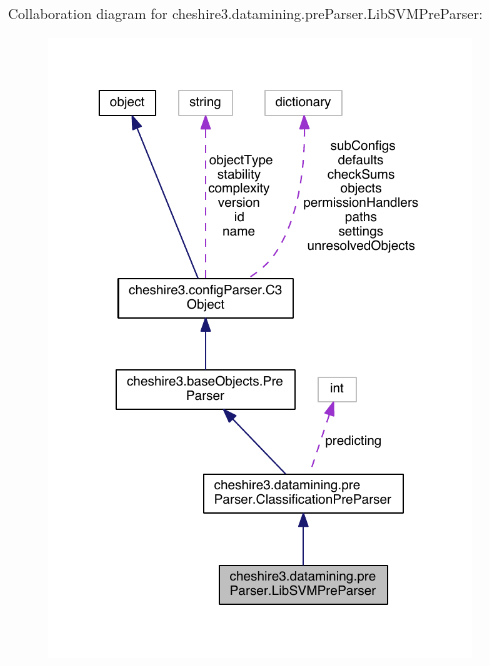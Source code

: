 Collaboration diagram for cheshire3.\-datamining.\-pre\-Parser.\-Lib\-S\-V\-M\-Pre\-Parser\-:
\nopagebreak
\begin{figure}[H]
\begin{center}
\leavevmode
\includegraphics[width=325pt]{classcheshire3_1_1datamining_1_1pre_parser_1_1_lib_s_v_m_pre_parser__coll__graph}
\end{center}
\end{figure}
